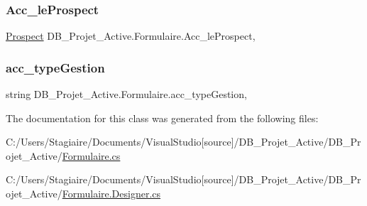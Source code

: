 \subsubsection{\texorpdfstring{Acc\_leProspect}{Acc\_leProspect}}
{\footnotesize\ttfamily \mbox{\hyperlink{class_d_b___projet___active_1_1_prospect}{Prospect}} D\+B\+\_\+\+Projet\+\_\+\+Active.\+Formulaire.\+Acc\+\_\+le\+Prospect\hspace{0.3cm}{\ttfamily [get]}, {\ttfamily [set]}}

\mbox{\label{class_d_b___projet___active_1_1_formulaire_a8bb489732412ac845958fb663f031923}} 
\subsubsection{\texorpdfstring{acc\_typeGestion}{acc\_typeGestion}}
{\footnotesize\ttfamily string D\+B\+\_\+\+Projet\+\_\+\+Active.\+Formulaire.\+acc\+\_\+type\+Gestion\hspace{0.3cm}{\ttfamily [get]}, {\ttfamily [set]}}



The documentation for this class was generated from the following files\+:\begin{DoxyCompactItemize}
\item 
C\+:/\+Users/\+Stagiaire/\+Documents/\+Visual\+Studio\mbox{[}source\mbox{]}/\+D\+B\+\_\+\+Projet\+\_\+\+Active/\+D\+B\+\_\+\+Projet\+\_\+\+Active/\mbox{\hyperlink{_formulaire_8cs}{Formulaire.\+cs}}\item 
C\+:/\+Users/\+Stagiaire/\+Documents/\+Visual\+Studio\mbox{[}source\mbox{]}/\+D\+B\+\_\+\+Projet\+\_\+\+Active/\+D\+B\+\_\+\+Projet\+\_\+\+Active/\mbox{\hyperlink{_formulaire_8_designer_8cs}{Formulaire.\+Designer.\+cs}}\end{DoxyCompactItemize}
